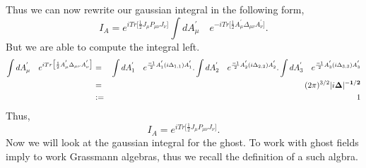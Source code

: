 \documentclass[a4paper,11pt]{article} %
\numberwithin{equation}{section} %
\numberwithin{figure}{section} %
\theoremstyle{plain} %
\theoremstyle{definition} %
\theoremstyle{remark} %
\begin{document}
Thus we can now rewrite our gaussian integral in the following form,
\begin{equation*}
 I_A = e^{i Tr\big[\frac{1}{2} J_{\mu} P_{\mu \nu} J_{\nu} \big] } \int  dA_{\mu}^{'} \quad e^{- i Tr\big[ \frac{1}{2} A^{'}_{\mu} \Delta_{\mu \nu} A^{'}_{\nu} \big] }.
\end{equation*}
But we are able to compute the integral left.
\begin{eqnarray*}
 \int  dA_{\mu}^{'} \quad e^{i Tr\big[ \frac{1}{2} A^{'}_{\mu} \Delta_{\mu \nu} A^{'}_{\nu} \big] } &=& \int  dA_{1}^{'} \quad e^{\frac{-1}{2} A^{'}_{1} (i \Delta_{1,1}) A^{'}_{1}} . \int  dA_{2}^{'} \quad e^{\frac{-1}{2} A^{'}_{2} (i \Delta_{2, 2}) A^{'}_{2} } . \int  dA_{3}^{'} \quad e^{\frac{-1}{2} A^{'}_{3} (i \Delta_{3,3}) A^{'}_{3}} \\
                                                                                                                      &=& (2 \pi)^{3/2} |i\bf{\Delta}|^{-1/2} \\
                                                                                                                      &:=& 1
\end{eqnarray*}
Thus,
\begin{equation*}
 I_A = e^{i Tr\big[\frac{1}{2} J_{\mu} P_{\mu \nu} J_{\nu} \big] }.
\end{equation*}
Now we will look at the gaussian integral for the ghost. To work with ghost fields imply to work Grassmann algebras, thus we recall the definition of a such algbra.
\end{document}
